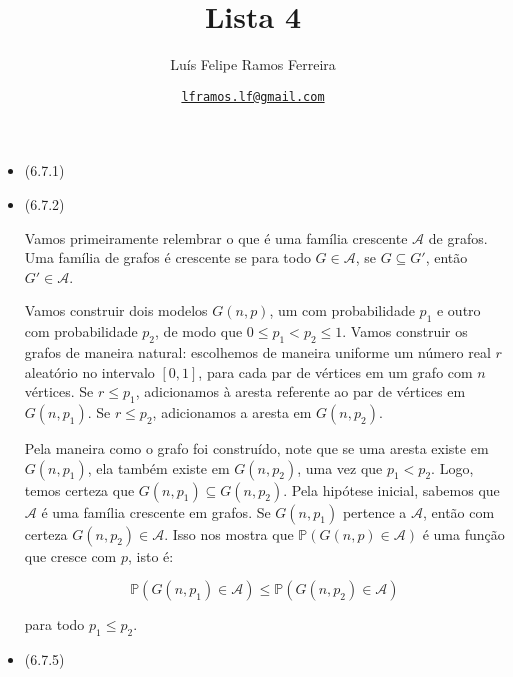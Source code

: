 \documentclass{article}
\title{Lista 4}
\author{Luís Felipe Ramos Ferreira}
\date{\href{mailto:lframos.lf@gmail.com}{\texttt{lframos.lf@gmail.com}}
}
\begin{document}
\maketitle

\begin{itemize}
	\item (6.7.1)
	\item (6.7.2)

	      Vamos primeiramente relembrar o que é uma família crescente \(\mathcal{A}\) de grafos. Uma família de grafos é crescente se para
	      todo \(G \in \mathcal{A}\), se \(G \subseteq G'\), então \(G' \in \mathcal{A}\).

	      Vamos construir dois modelos \(G(n, p)\), um com probabilidade \(p_1\) e outro com probabilidade \(p_2\), de modo que \(0 \leq p_1 < p_2 \leq 1\).
	      Vamos construir os grafos de maneira natural: escolhemos de maneira uniforme um número real \(r\) aleatório no intervalo \([0, 1]\), para cada par de vértices
	      em um grafo com \(n\) vértices. Se \(r \leq p_1\),  adicionamos à aresta referente ao par de vértices em \(G(n,p_1)\). Se \(r \leq p_2\), adicionamos a aresta
	      em \(G(n, p_2)\).

	      Pela maneira como o grafo foi construído, note que se uma aresta existe em \(G(n, p_1)\), ela também existe em \(G(n, p_2)\), uma vez que \(p_1 < p_2\). Logo, temos certeza
	      que \(G(n, p_1) \subseteq G(n, p_2)\). Pela hipótese inicial, sabemos que \(\mathcal{A}\) é uma família crescente em grafos. Se \(G(n, p_1)\) pertence a \(\mathcal{A}\),
	      então com certeza \(G(n, p_2) \in \mathcal{A}\). Isso nos mostra que \(\mathbb{P}(G(n, p) \in \mathcal{A})\) é uma função que cresce com \(p\), isto é:

	      \[\mathbb{P}(G(n, p_1) \in \mathcal{A}) \leq \mathbb{P}(G(n, p_2) \in \mathcal{A})\]

	      para todo \(p_1 \leq p_2\).

	\item (6.7.5)




\end{itemize}
\end{document}
